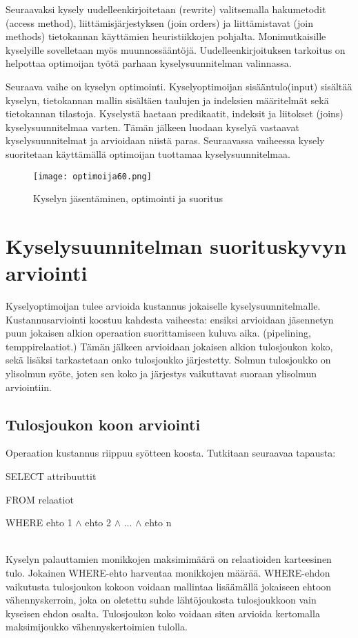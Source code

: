 \documentclass[finnish]{tktltiki2}
\theoremstyle{definition}
\theoremstyle{remark}
\begin{document}
Seuraavaksi kysely uudelleenkirjoitetaan (rewrite) valitsemalla hakumetodit (access method), liittämisjärjestyksen (join orders) ja liittämistavat (join methods) tietokannan käyttämien heuristiikkojen pohjalta. Monimutkaisille kyselyille sovelletaan myös muunnossääntöjä. \cite{mahajan2012}
Uudelleenkirjoituksen tarkoitus on helpottaa optimoijan työtä parhaan kyselysuunnitelman valinnassa.

Seuraava vaihe on kyselyn optimointi. Kyselyoptimoijan sisääntulo(input) sisältää kyselyn, tietokannan mallin sisältäen taulujen ja indeksien määritelmät sekä tietokannan tilastoja. Kyselystä haetaan predikaatit, indeksit ja liitokset (joins) kyselysuunnitelmaa varten. Tämän jälkeen luodaan kyselyä vastaavat kyselysuunnitelmat ja arvioidaan niistä paras. Seuraavassa vaiheessa kysely suoritetaan käyttämällä optimoijan tuottamaa kyselysuunnitelmaa.

\begin{figure}[!h]
  \caption{Kyselyn jäsentäminen, optimointi ja suoritus}
  \centering
    \texttt{[image: optimoija60.png]}
\end{figure}

\section{Kyselysuunnitelman suorituskyvyn arviointi}
Kyselyoptimoijan tulee arvioida kustannus jokaiselle kyselysuunnitelmalle. Kustannusarviointi koostuu kahdesta vaiheesta: ensiksi arvioidaan jäsennetyn puun jokaisen alkion operaation suorittamiseen kuluva aika. (pipelining, temppirelaatiot.)
Tämän jälkeen arvioidaan jokaisen alkion tulosjoukon koko, sekä lisäksi tarkastetaan onko tulosjoukko järjestetty. Solmun tulosjoukko on ylisolmun syöte, joten sen koko ja järjestys vaikuttavat suoraan ylisolmun arviointiin.

\subsection{Tulosjoukon koon arviointi}
Operaation kustannus riippuu syötteen koosta. Tutkitaan seuraavaa tapausta:
\newline

\begin{frame}

SELECT attribuuttit

FROM relaatiot

WHERE ehto 1 $\wedge$ ehto 2 $\wedge$ ... $\wedge$ ehto n
\end{frame}
\\
\newline
Kyselyn palauttamien monikkojen maksimimäärä on relaatioiden karteesinen tulo. Jokainen WHERE-ehto harventaa monikkojen määrää. WHERE-ehdon vaikutusta tulosjoukon kokoon voidaan mallintaa lisäämällä jokaiseen ehtoon vähennyskerroin, joka on oletettu suhde lähtöjoukosta tulosjoukkoon vain kyseisen ehdon osalta.
Tulosjoukon koko voidaan siten arvioida kertomalla maksimijoukko vähennyskertoimien tulolla. \cite{ramakrishnan2003database}
\end{document}
